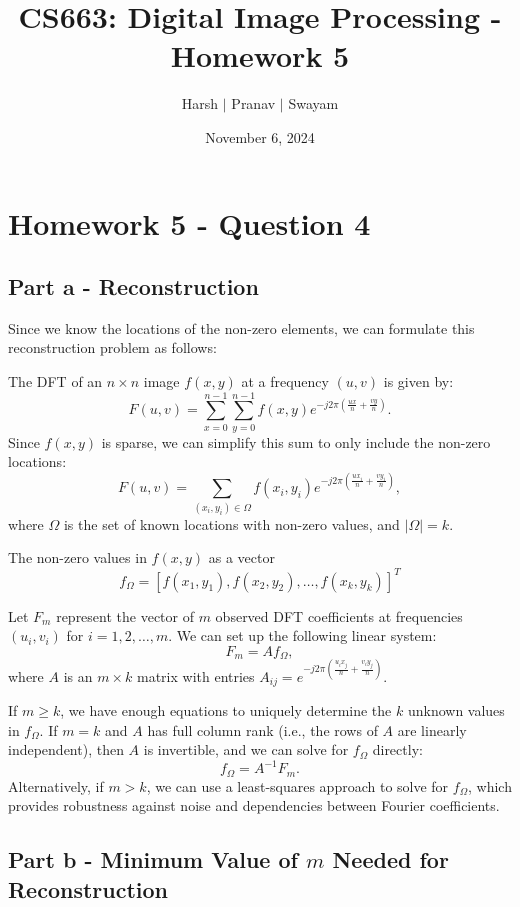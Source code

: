\documentclass{article}
\title{CS663: Digital Image Processing - Homework 5}
\author{Harsh $\vert$ Pranav $\vert$ Swayam}
\date{November 6, 2024}
\begin{document}
\maketitle
\flushleft
\section*{Homework 5 - Question 4}

\subsection*{Part a - Reconstruction}

Since we know the locations of the non-zero elements, we can formulate this reconstruction problem as follows:

   
   The DFT of an \( n \times n \) image \( f(x, y) \) at a frequency \( (u, v) \) is given by:
   \[
   F(u, v) = \sum_{x=0}^{n-1} \sum_{y=0}^{n-1} f(x, y) e^{-j 2 \pi \left( \frac{ux}{n} + \frac{vy}{n} \right)}.
   \]
   Since \( f(x, y) \) is sparse, we can simplify this sum to only include the non-zero locations:
   \[
   F(u, v) = \sum_{(x_i, y_i) \in \Omega} f(x_i, y_i) e^{-j 2 \pi \left( \frac{ux_i}{n} + \frac{vy_i}{n} \right)},
   \]
   where \( \Omega \) is the set of known locations with non-zero values, and \( |\Omega| = k \).

   
   The non-zero values in \( f(x, y) \) as a vector 
   \[ f_\Omega = [f(x_1, y_1), f(x_2, y_2), \ldots, f(x_k, y_k)]^T \]
   
   Let \( F_m \) represent the vector of \( m \) observed DFT coefficients at frequencies \( (u_i, v_i) \) for \( i = 1, 2, \dots, m \).
   We can set up the following linear system:
   \[
   F_m = A f_\Omega,
   \]
   where \( A \) is an \( m \times k \) matrix with entries \( A_{ij} = e^{-j 2 \pi \left( \frac{u_i x_j}{n} + \frac{v_i y_j}{n} \right)} \).


   If \( m \geq k \), we have enough equations to uniquely determine the \( k \) unknown values in \( f_\Omega \).
   If \( m = k \) and \( A \) has full column rank (i.e., the rows of \( A \) are linearly independent), then \( A \) is invertible, and we can solve for \( f_\Omega \) directly:
   \[
   f_\Omega = A^{-1} F_m.
   \]
   Alternatively, if \( m > k \), we can use a least-squares approach to solve for \( f_\Omega \), which provides robustness against noise and dependencies between Fourier coefficients.

\subsection*{Part b - Minimum Value of \( m \) Needed for Reconstruction}
\end{document}
